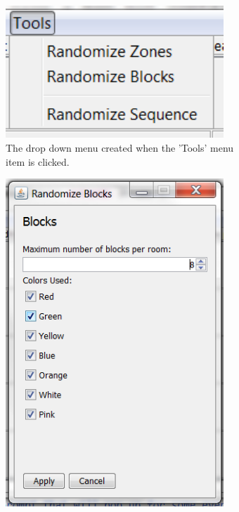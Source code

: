  \begin{figure}[h!!!]
        \centering
        \begin{subfigure}[b]{0.32\textwidth} 
	\center
	\includegraphics[width=0.9\textwidth]{EnvironmentStore/DropDownTools.png}
	\caption{The drop down menu created when the 'Tools' menu item is clicked.}
	\label{fig:DropDownTools}
        \end{subfigure}
        \begin{subfigure}[b]{0.32\textwidth}
	\center
	\includegraphics[width=0.9\textwidth]{EnvironmentStore/MenuBlocks.png}

\end{subfigure}
\end{figure}
